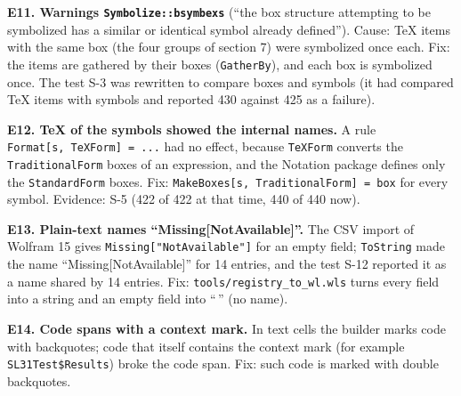 \documentclass[
  10pt,
]{article}
\begin{document}
\textbf{E11. Warnings \texttt{Symbolize::bsymbexs}} (``the box structure
attempting to be symbolized has a similar or identical symbol already
defined''). Cause: TeX items with the same box (the four groups of
section 7) were symbolized once each. Fix: the items are gathered by
their boxes (\texttt{GatherBy}), and each box is symbolized once. The
test S-3 was rewritten to compare boxes and symbols (it had compared TeX
items with symbols and reported 430 against 425 as a failure).

\textbf{E12. TeX of the symbols showed the internal names.} A rule
\texttt{Format{[}s,\ TeXForm{]}\ =\ ...} had no effect, because
\texttt{TeXForm} converts the \texttt{TraditionalForm} boxes of an
expression, and the Notation package defines only the
\texttt{StandardForm} boxes. Fix:
\texttt{MakeBoxes{[}s,\ TraditionalForm{]}\ =\ box} for every symbol.
Evidence: S-5 (422 of 422 at that time, 440 of 440 now).

\textbf{E13. Plain-text names ``Missing{[}NotAvailable{]}''.} The CSV
import of Wolfram 15 gives \texttt{Missing{[}"NotAvailable"{]}} for an
empty field; \texttt{ToString} made the name
``Missing{[}NotAvailable{]}'' for 14 entries, and the test S-12 reported
it as a name shared by 14 entries. Fix:
\texttt{tools/registry\_to\_wl.wls} turns every field into a string and
an empty field into ``\,'' (no name).

\textbf{E14. Code spans with a context mark.} In text cells the builder
marks code with backquotes; code that itself contains the context mark
\texttt{\textasciigrave{}} (for example
\texttt{SL31\textasciigrave{}Test\textasciigrave{}\$Results}) broke the
code span. Fix: such code is marked with double backquotes.
\end{document}

